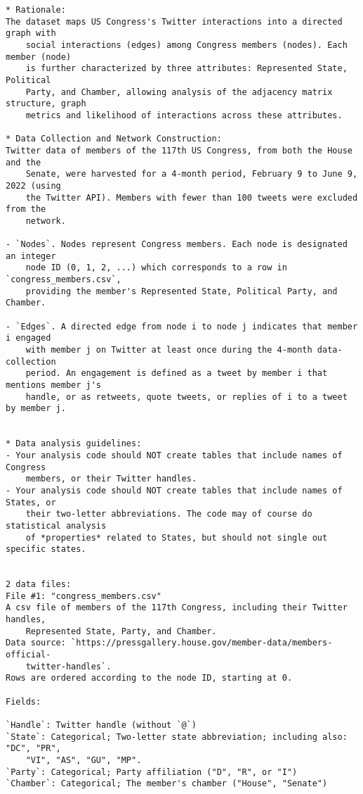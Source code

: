 \documentclass[11pt]{article}
\begin{document}
\begin{Verbatim}[tabsize=4]
* Rationale:
The dataset maps US Congress's Twitter interactions into a directed graph with
	social interactions (edges) among Congress members (nodes). Each member (node)
	is further characterized by three attributes: Represented State, Political
	Party, and Chamber, allowing analysis of the adjacency matrix structure, graph
	metrics and likelihood of interactions across these attributes.

* Data Collection and Network Construction:
Twitter data of members of the 117th US Congress, from both the House and the
	Senate, were harvested for a 4-month period, February 9 to June 9, 2022 (using
	the Twitter API). Members with fewer than 100 tweets were excluded from the
	network.

- `Nodes`. Nodes represent Congress members. Each node is designated an integer
	node ID (0, 1, 2, ...) which corresponds to a row in `congress_members.csv`,
	providing the member's Represented State, Political Party, and Chamber.

- `Edges`. A directed edge from node i to node j indicates that member i engaged
	with member j on Twitter at least once during the 4-month data-collection
	period. An engagement is defined as a tweet by member i that mentions member j's
	handle, or as retweets, quote tweets, or replies of i to a tweet by member j.


* Data analysis guidelines:
- Your analysis code should NOT create tables that include names of Congress
	members, or their Twitter handles.
- Your analysis code should NOT create tables that include names of States, or
	their two-letter abbreviations. The code may of course do statistical analysis
	of *properties* related to States, but should not single out specific states.


2 data files:
File #1: "congress_members.csv"
A csv file of members of the 117th Congress, including their Twitter handles,
	Represented State, Party, and Chamber.
Data source: `https://pressgallery.house.gov/member-data/members-official-
	twitter-handles`.
Rows are ordered according to the node ID, starting at 0.

Fields:

`Handle`: Twitter handle (without `@`)
`State`: Categorical; Two-letter state abbreviation; including also: "DC", "PR",
	"VI", "AS", "GU", "MP".
`Party`: Categorical; Party affiliation ("D", "R", or "I")
`Chamber`: Categorical; The member's chamber ("House", "Senate")



\end{Verbatim}
\end{document}
